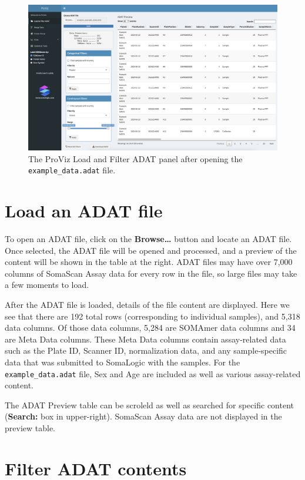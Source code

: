 \documentclass[
]{book}
\begin{document}
\begin{figure}
\centering
\includegraphics{images/LoadAndFilter.png}
\caption{The ProViz Load and Filter ADAT panel after opening the \texttt{example\_data.adat} file.}
\end{figure}

\hypertarget{load-an-adat-file}{%
\section{Load an ADAT file}\label{load-an-adat-file}}

To open an ADAT file, click on the \textbf{Browse\ldots{}} button and locate an ADAT file. Once selected, the ADAT file will be opened and processed, and a preview of the content will be shown in the table at the right. ADAT files may have over 7,000 columns of SomaScan Assay data for every row in the file, so large files may take a few moments to load.

After the ADAT file is loaded, details of the file content are displayed. Here we see that there are 192 total rows (corresponding to individual samples), and 5,318 data columns. Of those data columns, 5,284 are SOMAmer data columns and 34 are Meta Data columns. These Meta Data columns contain assay-related data such as the Plate ID, Scanner ID, normalization data, and any sample-specific data that was submitted to SomaLogic with the samples. For the \texttt{example\_data.adat} file, Sex and Age are included as well as various assay-related content.

The ADAT Preview table can be scroleld as well as searched for specific content (\textbf{Search:} box in upper-right). SomaScan Assay data are not displayed in the preview table.

\hypertarget{filter-adat-contents}{%
\section{Filter ADAT contents}\label{filter-adat-contents}}
\end{document}
